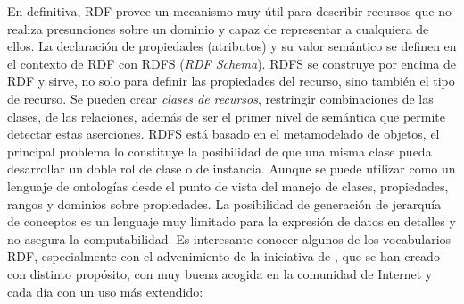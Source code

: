En definitiva, RDF provee un mecanismo muy útil para describir recursos que
no realiza presunciones sobre un dominio y capaz de representar a cualquiera
de ellos. La declaración de propiedades (atributos) y su valor semántico se definen
en el contexto de RDF con RDFS (\textit{\gls{RDF Schema}}). RDFS se construye por
encima de RDF y sirve, no solo para definir las propiedades del recurso, sino también
el tipo de recurso. Se pueden crear \textit{clases de recursos}, restringir
combinaciones de las clases, de las relaciones, además de ser el primer nivel de
semántica que permite detectar estas aserciones. RDFS está basado en el
metamodelado de objetos, el principal problema lo constituye la posibilidad de que una
misma clase pueda desarrollar un doble rol de clase o de instancia. Aunque se puede utilizar como
un lenguaje de ontologías desde el punto de vista del manejo de clases, propiedades, rangos y dominios sobre propiedades. 
La posibilidad de generación de jerarquía de conceptos es un lenguaje muy limitado para la expresión de datos en
detalles y no asegura la computabilidad. Es interesante conocer algunos de los vocabularios RDF, especialmente
con el advenimiento de la iniciativa de \linkeddata, que se han creado con distinto propósito, con muy buena 
acogida en la comunidad de Internet y cada día con un uso más extendido: 

